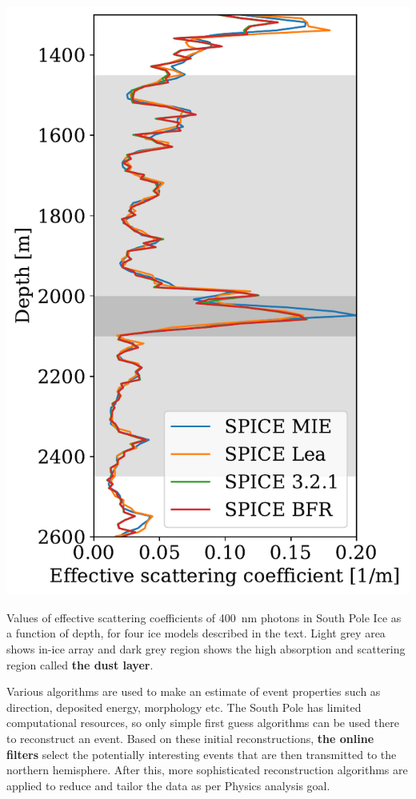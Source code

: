 \begin{marginfigure}
    \vspace*{-2cm}
	\centering \includegraphics{./figures/nu_in_icecube/scattering.pdf}
	\caption[Scattering profiles of photons in the South Pole Ice, comparing various ice models]{Values of effective scattering coefficients of 400~nm photons in South Pole Ice as a function of depth, for four ice models described in the text. Light grey area shows in-ice array and dark grey region shows the high absorption and scattering region called \textbf{the dust layer}.}
\end{marginfigure}
Various algorithms are used to make an estimate of event properties such as direction, deposited energy, morphology etc. The South Pole has limited computational resources, so only simple first guess algorithms can be used there to reconstruct an event. Based on these initial reconstructions, \textbf{the online filters} select the potentially interesting events that are then transmitted to the northern hemisphere. After this, more sophisticated reconstruction algorithms are applied to reduce and tailor the data as per Physics analysis goal. 


